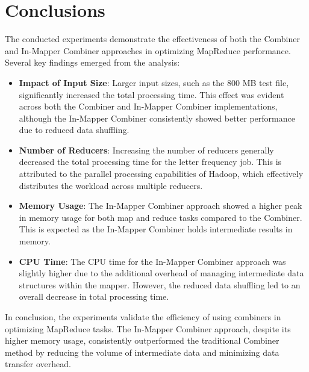 \newpage
\section{Conclusions}
The conducted experiments demonstrate the effectiveness of both the Combiner and In-Mapper Combiner approaches in optimizing MapReduce performance. Several key findings emerged from the analysis:

\begin{itemize}
\item \textbf{Impact of Input Size}: Larger input sizes, such as the 800 MB test file, significantly increased the total processing time. This effect was evident across both the Combiner and In-Mapper Combiner implementations, although the In-Mapper Combiner consistently showed better performance due to reduced data shuffling.
\item \textbf{Number of Reducers}: Increasing the number of reducers generally decreased the total processing time for the letter frequency job. This is attributed to the parallel processing capabilities of Hadoop, which effectively distributes the workload across multiple reducers.
\item \textbf{Memory Usage}: The In-Mapper Combiner approach showed a higher peak in memory usage for both map and reduce tasks compared to the Combiner. This is expected as the In-Mapper Combiner holds intermediate results in memory.
\item \textbf{CPU Time}: The CPU time for the In-Mapper Combiner approach was slightly higher due to the additional overhead of managing intermediate data structures within the mapper. However, the reduced data shuffling led to an overall decrease in total processing time.
\end{itemize}

\noindent In conclusion, the experiments validate the efficiency of using combiners in optimizing MapReduce tasks. The In-Mapper Combiner approach, despite its higher memory usage, consistently outperformed the traditional Combiner method by reducing the volume of intermediate data and minimizing data transfer overhead. 
